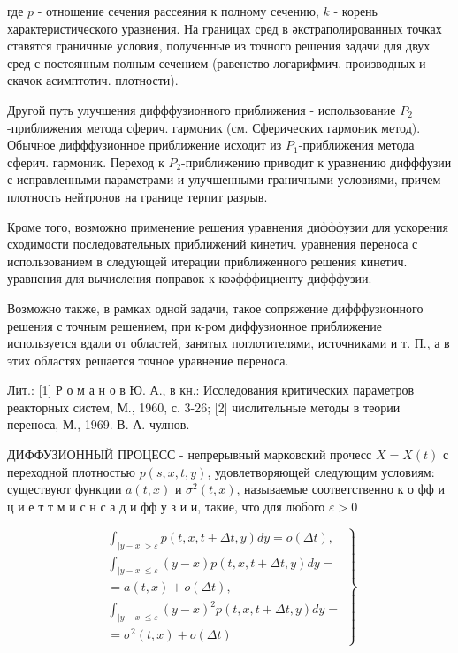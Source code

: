 \documentclass[10pt]{article}
\begin{document}
где $p$ - отношение сечения рассеяния к полному сечению, $k$ - корень характеристического уравнения. На границах сред в әкстраполированных точках ставятся граничные условия, полученные из точного решения задачи для двух сред с постоянным полным сечением (равенство логарифмич. производных и скачок асимптотич. плотности).



Другой путь улучшения дифффузионного приближения - использование $P_{2}$-приближения метода сферич. гармоник (см. Сферических гармоник метод). Обычное дифффузионное приближение исходит из $P_{1}$-приближения метода сферич. гармоник. Переход к $P_{2}$-приближению приводит к уравнению дифффузии с исправленными параметрами и улучшенными граничными условиями, причем плотность нейтронов на границе терпит разрыв.



Кроме того, возможно применение решения уравнения дифффузии для ускорения сходимости последовательных приближений кинетич. уравнения переноса с использованием в следующей итерации приближенного решения кинетич. уравнения для вычисления поправок к коәфффициенту дифффузии.



Возможно также, в рамках одной задачи, такое сопряжение дифффузионного решения с точным решением, при к-ром диффузионное приближение используется вдали от областей, занятых поглотителями, источниками и т. П., а в этих областях решается точное уравнение переноса.



Лит.: [1] Р о м а н о в Ю. А., в кн.: Исследования критических параметров реакторных систем, М., 1960, с. 3-26; [2] числительные методы в теории переноса, М., 1969. В. А. чулнов.



ДИФФУЗИОННЫЙ ПРОЦЕСС - непрерывный марковский прочесс $X=X(t)$ с переходной плотностью $p(s, x, t, y)$, удовлетворяющей следующим условиям: существуют функции $a(t, x)$ и $\sigma^{2}(t, x)$, называемые соответственно к о фф и ц и е т т м и с н с а д и фф у з и и, такие, что для любого $\varepsilon>0$



\[

\left.\begin{array}{c}

\int_{|y-x|>\varepsilon} p(t, x, t+\Delta t, y) d y=o(\Delta t), \\

\int_{|y-x| \leqslant \varepsilon}(y-x) p(t, x, t+\Delta t, y) d y= \\

=a(t, x)+o(\Delta t), \\

\int_{|y-x| \leqslant \varepsilon}(y-x)^{2} p(t, x, t+\Delta t, y) d y= \\

=\sigma^{2}(t, x)+o(\Delta t)

\end{array}\right\}

\]
\end{document}
